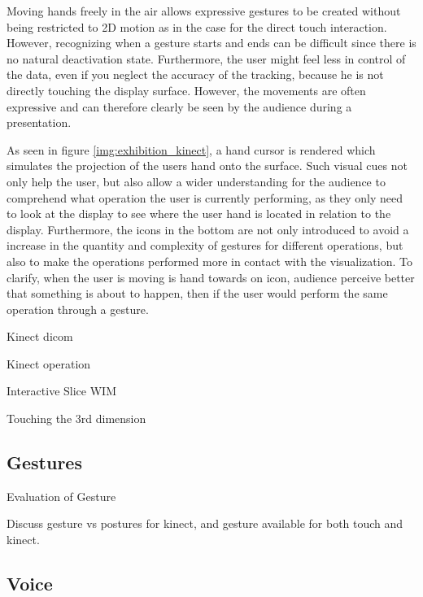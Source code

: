 \documentclass[review,journal]{vgtc}         %
\begin{document}
Moving hands freely in the air allows expressive gestures to be created without being restricted to 2D motion as in the case for the direct touch interaction. However, recognizing when a gesture starts and ends can be difficult since there is no natural deactivation state. Furthermore, the user might feel less in control of the data, even if you neglect the accuracy of the tracking, because he is not directly touching the display surface. However, the movements are often expressive and can therefore clearly be seen by the audience during a presentation. 

As seen in figure \ref{img:exhibition_kinect}, a hand cursor is rendered which simulates the projection of the users hand onto the surface. Such visual cues not only help the user, but also allow a wider understanding for the audience to comprehend what operation the user is currently performing, as they only need to look at the display to see where the user hand is located in relation to the display. Furthermore, the icons in the bottom are not only introduced to avoid a increase in the quantity and complexity of gestures for different operations, but also to make the operations performed more in contact with the visualization. To clarify, when the user is moving is hand towards on icon, audience perceive better that something is about to happen, then if the user would perform the same operation through a gesture.

Kinect dicom \cite{zora82163}

Kinect operation \cite{OHaraGSPVMCCRDC14}

Interactive Slice WIM \cite{Coffey:2012:ISW:2360744.2360843}


Touching the 3rd dimension \cite{DBLP:journals/dagstuhl-reports/KeefeKSR12}

\subsection{Gestures}

Evaluation of Gesture \cite{Kirmizibayrak:2011:EGB:2087756.2087764}

Discuss gesture vs postures \cite{isenberg:hal-00781237} for kinect, and gesture available for both touch and kinect.

\subsection{Voice}
\end{document}
